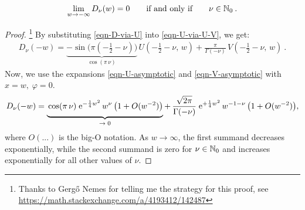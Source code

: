 \begin{lemma}
	\begin{equation*}
		\lim_{w \to -\infty} D_\nu(w) = 0
		\qquad \text{if and only if} \qquad
		\nu \in \mathbb{N}_0
		\: .
	\end{equation*}
	\label{lemma-parabolic-cylinder-asymp}
\end{lemma}
\begin{proof}
	\footnote{Thanks to Gergő Nemes for telling me the strategy for this proof, see \url{https://math.stackexchange.com/a/4193412/142487}}
	By substituting \eqref{eqn-D-via-U} into \eqref{eqn-U-via-U-V}, we get:
	\begin{align*}
		D_\nu(-w)
		= \underbrace{- \sin\big(\pi(-\tfrac{1}{2} - \nu)\big)}_{\cos(\pi \, \nu)}
		\, U(-\tfrac{1}{2} - \nu, \, w)
		+ \frac{\pi}{\Gamma(-\nu)}
		\, V(-\tfrac{1}{2} - \nu, \, w)
		\: .
	\end{align*}
	Now, we use the expansions \eqref{eqn-U-asymptotic} and \eqref{eqn-V-asymptotic} with $x = w, \; \varphi = 0$.
	\begin{align*}
		D_\nu(-w)
		=
		\underbrace{
			\vph{\frac{A}{B}}
			\cos(\pi \, \nu)
			\; \e{-\frac{1}{4} w^2}
			\, w^\nu
			\, \big( 1 + O(w^{-2}) \big)
		}_{\to \; 0}
		+\, \frac{\sqrt{2\pi}}{\Gamma(-\nu)}
		\; \e{+\frac{1}{4} w^2}
		\, w^{-1-\nu}
		\, \big( 1 + O(w^{-2})\big) ,
	\end{align*}
	where $O(...)$ is the big-O notation. As $w \to \infty$, the first summand decreases exponentially, while the second summand is zero for $\nu\in\mathbb{N}_0$ and increases exponentially for all other values of $\nu$.
\end{proof}